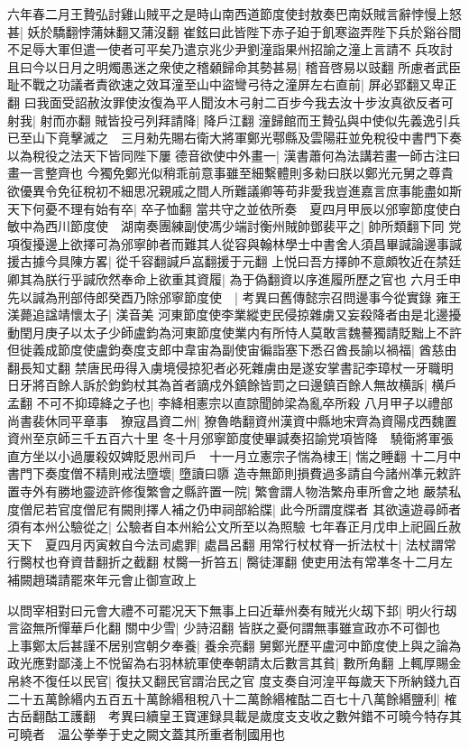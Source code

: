 六年春二月王贄弘討雞山賊平之是時山南西道節度使封敖奏巴南妖賊言辭悖慢上怒甚|{
	妖於驕翻悖蒲妹翻又蒲沒翻}
崔鉉曰此皆陛下赤子廹于飢寒盜弄陛下兵於谿谷間不足辱大軍但遣一使者可平矣乃遣京兆少尹劉潼詣果州招諭之潼上言請不兵攻討且曰今以日月之明燭愚迷之衆使之稽顙歸命其勢甚易|{
	稽音啓易以豉翻}
所慮者武臣耻不戰之功議者責欲速之效耳潼至山中盜彎弓待之潼屏左右直前|{
	屏必郢翻又卑正翻}
曰我面受詔赦汝罪使汝復為平人聞汝木弓射二百步今我去汝十步汝真欲反者可射我|{
	射而亦翻}
賊皆投弓列拜請降|{
	降戶江翻}
潼歸館而王贄弘與中使似先義逸引兵已至山下竟擊滅之　三月勑先賜右衛大將軍鄭光鄠縣及雲陽莊並免稅役中書門下奏以為稅役之法天下皆同陛下屢德音欲使中外畫一|{
	漢書蕭何為法講若畫一師古注曰畫一言整齊也}
今獨免鄭光似稍乖前意事雖至細繫體則多勑曰朕以鄭光元舅之尊貴欲優異令免征稅初不細思况親戚之間人所難議卿等苟非愛我豈進嘉言庶事能盡如斯天下何憂不理有始有卒|{
	卒子恤翻}
當共守之並依所奏　夏四月甲辰以邠寧節度使白敏中為西川節度使　湖南奏團練副使馮少端討衡州賊帥鄧裴平之|{
	帥所類翻下同}
党項復擾邊上欲擇可為邠寧帥者而難其人從容與翰林學士中書舍人須昌畢諴論邊事諴援古據今具陳方畧|{
	從千容翻諴戶嵓翻援于元翻}
上悦曰吾方擇帥不意頗牧近在禁廷卿其為朕行乎諴欣然奉命上欲重其資履|{
	為于偽翻資以序進履所歷之官也}
六月壬申先以諴為刑部侍郎癸酉乃除邠寧節度使　|{
	考異曰舊傳懿宗召問邊事今從實錄}
雍王渼薨追諡靖懷太子|{
	渼音美}
河東節度使李業縱吏民侵掠雜虜又妄殺降者由是北邊擾動閏月庚子以太子少師盧鈞為河東節度使業内有所恃人莫敢言魏謩獨請貶黜上不許但徙義成節度使盧鈞奏度支郎中韋宙為副使宙徧詣塞下悉召酋長諭以禍福|{
	酋慈由翻長知丈翻}
禁唐民毋得入虜境侵掠犯者必死雜虜由是遂安掌書記李璋杖一牙職明日牙將百餘人訴於鈞鈞杖其為首者謫戍外鎮餘皆罰之曰邊鎮百餘人無故横訴|{
	横戶孟翻}
不可不抑璋絳之子也|{
	李絳相憲宗以直諒聞帥梁為亂卒所殺}
八月甲子以禮部尚書裴休同平章事　獠寇昌資二州|{
	獠魯皓翻資州漢資中縣地宋齊為資陽戍西魏置資州至京師三千五百六十里}
冬十月邠寧節度使畢諴奏招諭党項皆降　驍衛將軍張直方坐以小過屢殺奴婢貶恩州司戶　十一月立憲宗子惴為棣王|{
	惴之睡翻}
十二月中書門下奏度僧不精則戒法墮壞|{
	墮讀曰隳}
造寺無節則損費過多請自今諸州凖元敕許置寺外有勝地靈迹許修復繁會之縣許置一院|{
	繁會謂人物浩繁舟車所會之地}
嚴禁私度僧尼若官度僧尼有闕則擇人補之仍申祠部給牒|{
	此今所謂度牒者}
其欲遠遊尋師者須有本州公驗從之|{
	公驗者自本州給公文所至以為照驗}
七年春正月戊申上祀圓丘赦天下　夏四月丙寅敕自今法司處罪|{
	處昌呂翻}
用常行杖杖脊一折法杖十|{
	法杖謂常行臋杖也脊資昔翻折之截翻}
杖臋一折笞五|{
	臋徒渾翻}
使吏用法有常凖冬十二月左補闕趙璘請罷來年元會止御宣政上

以問宰相對曰元會大禮不可罷况天下無事上曰近華州奏有賊光火刼下邽|{
	明火行刼言盜無所憚華戶化翻}
關中少雪|{
	少詩沼翻}
皆朕之憂何謂無事雖宣政亦不可御也　上事鄭太后甚謹不居别宫朝夕奉養|{
	養余亮翻}
舅鄭光歷平盧河中節度使上與之論為政光應對鄙淺上不悦留為右羽林統軍使奉朝請太后數言其貧|{
	數所角翻}
上輒厚賜金帛終不復任以民官|{
	復扶又翻民官謂治民之官}
度支奏自河湟平每歲天下所納錢九百二十五萬餘緡内五百五十萬餘緡租稅八十二萬餘緡榷酤二百七十八萬餘緡鹽利|{
	榷古岳翻酤工護翻　考異曰續皇王寶運録具載是歲度支支收之數舛錯不可曉今特存其可曉者　温公拳拳于史之闕文蓋其所重者制國用也}


